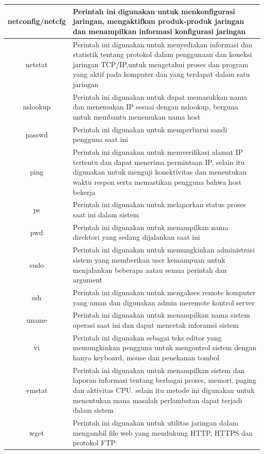 \begin{table}[h]
\begin{tabular}{|c|l|}
			\hline
			netconfig/netcfg&Perintah ini digunakan untuk menkonfigurasi jaringan, mengaktifkan produk-produk jaringan dan menampilkan informasi konfigurasi jaringan\\
			\hline
			netstat&Perintah ini digunakan untuk menyediakan informasi dan statistik tentang protokol dalam penggunaan dan koneksi jaringan TCP/IP,untuk mengetahui proses dan program yang aktif pada komputer dan yang terdapat dalam satu jaringan\\
			\hline
			 nslookup&Perintah ini digunakan untuk dapat memasukkan nama dan menemukan IP sesuai dengan nslookup, berguna untuk membantu menemukan nama host\\
			\hline
			passwd&Perintah ini digunakan untuk memperbarui sandi pengguna saat ini\\
			\hline
			ping&Perintah ini digunakan untuk memverifikasi alamat IP tertentu dan dapat menerima permintaan IP, selain itu digunakan untuk menguji konektivitas dan menentukan waktu respon serta memastikan pengguna bahwa host bekerja\\
			\hline
			ps&Perintah ini digunakan untuk melaporkan status proses saat ini dalam sistem\\
			\hline
			pwd&Perintah ini digunakan untuk menampilkan nama direktori yang sedang dijalankan saat ini\\
			\hline
			sudo&Perintah ini digunakan untuk memungkinkan administrasi sistem yang memberikan user kemampuan untuk menjalankan beberapa aatau semua perintah dan argument\\
			\hline
			ssh&Perintah ini digunakan untuk mengakses remote komputer yang aman dan digunakan admin meremote kontrol server\\
			\hline
			uname&Perintah ini digunakan untuk menampilkan nama sistem operasi saat ini dan dapat mencetak inforamsi sistem\\
			\hline
			vi&Perintah ini digunakan sebagai teks editor yang memungkinkan pengguna untuk mengontrol sistem dengan hanya keyboard, mouse dan penekanan tombol \\
			\hline
			vmstat&Perintah ini digunakan untuk menampilkan sistem dan laporan informasi tentang berbagai proses, memori, paging dan aktivitas CPU. selain itu metode ini digunakan untuk menentukan mana masalah perlambatan dapat terjadi dalam sistem\\
			\hline
			wget&Perintah ini digunakan untuk utilitas jaringan dalam mengambil file web yang mendukung HTTP, HTTPS dan protokol FTP\\
			\hline
		\end{tabular}
		\end{table}

